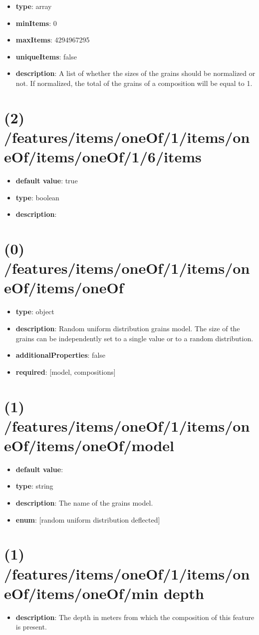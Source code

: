 \begin{itemize}[leftmargin=1em]\item {\bf type}: array
\item {\bf minItems}: 0
\item {\bf maxItems}: 4294967295
\item {\bf uniqueItems}: false
\item {\bf description}: A list of whether the sizes of the grains should be normalized or not. If normalized, the total of the grains of a composition will be equal to 1.
\end{itemize}\section{(2) /features/items/oneOf/1/items/oneOf/items/oneOf/1/6/items}
\begin{itemize}[leftmargin=2em]\item {\bf default value}: true
\item {\bf type}: boolean
\item {\bf description}: 
\end{itemize}\section{(0) /features/items/oneOf/1/items/oneOf/items/oneOf}
\begin{itemize}[leftmargin=0em]\item {\bf type}: object
\item {\bf description}: Random uniform distribution grains model. The size of the grains can be independently set to a single value or to a random distribution.
\item {\bf additionalProperties}: false
\item {\bf required}: [model, compositions]\end{itemize}
\section{(1) /features/items/oneOf/1/items/oneOf/items/oneOf/model}
\begin{itemize}[leftmargin=1em]\item {\bf default value}: 
\item {\bf type}: string
\item {\bf description}: The name of the grains model.
\item {\bf enum}: [random uniform distribution deflected]\end{itemize}\section{(1) /features/items/oneOf/1/items/oneOf/items/oneOf/min depth}
\begin{itemize}[leftmargin=1em]\item {\bf description}: The depth in meters from which the composition of this feature is present.
\end{itemize}
